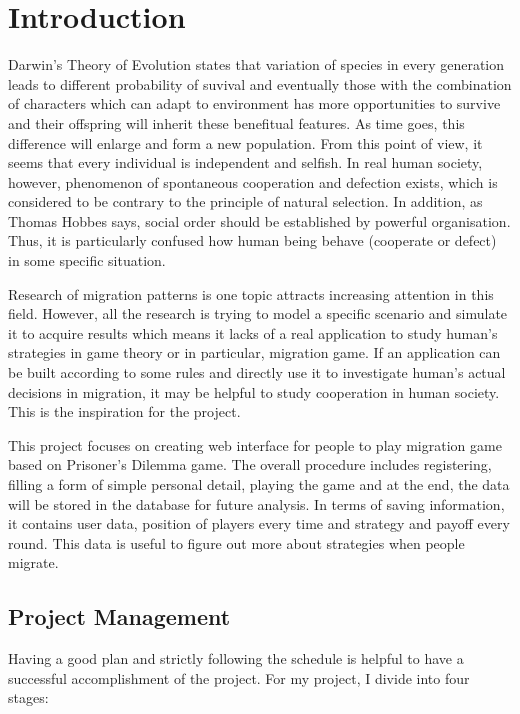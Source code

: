 

\chapter{Introduction} \label{Chapter:Introduction}
Darwin's Theory of Evolution states that variation of species in every generation leads to different probability of suvival and eventually those with the combination of characters which can adapt to environment has more opportunities to survive and their offspring will inherit these benefitual features. As time goes, this difference will enlarge and form a new population. From this point of view, it seems that every individual is independent and selfish. In real human society, however, phenomenon of spontaneous cooperation and defection exists, which is considered to be contrary to the principle of natural selection. In addition, as Thomas Hobbes says, social order should be established by powerful organisation. Thus, it is particularly confused how human being behave (cooperate or defect) in some specific situation. 

Research of migration patterns is one topic attracts increasing attention in this field. However, all the research is trying to model a specific scenario and simulate it to acquire results which means it lacks of a real application to study human's strategies in game theory or in particular, migration game. If an application can be built according to some rules and directly use it to investigate human's actual decisions in migration, it may be helpful to study cooperation in human society. This is the inspiration for the project.

This project focuses on creating web interface for people to play migration game based on Prisoner's Dilemma game. The overall procedure includes registering, filling a form of simple personal detail, playing the game and at the end, the data will be stored in the database for future analysis. In terms of saving information, it contains user data, position of players every time and strategy and payoff every round. This data is useful to figure out more about strategies when people migrate.

\section{Project Management}
Having a good plan and strictly following the schedule is helpful to have a successful accomplishment of the project. For my project, I divide into four stages:

